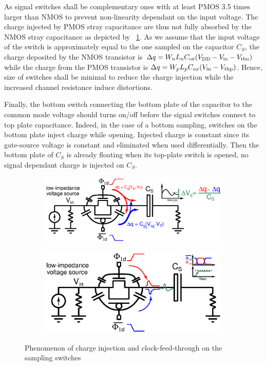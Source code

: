 As signal switches shall be complementary ones with at least PMOS 3.5 times larger than NMOS to prevent non-linearity dependant on the input voltage. The charge injected by PMOS stray capacitance are thus not fully absorbed by the NMOS stray capacitance as depicted by \figurename~\ref{fig:charge-injection-switches}. As we assume that the input voltage of the switch is approximately equal to the one sampled on the capacitor \(C_S\), the charge deposited by the NMOS transistor is \(\Delta q = W_nL_nC_{\rm ox}(V_{\rm DD}-V_{\rm in}-V_{\rm thn}) \) while the charge from the PMOS transistor is \(\Delta q = W_pL_pC_{ox}(V_{\rm in}-V_{\rm thp}) \). Hence, size of switches shall be minimal to reduce the charge injection while the increased channel resistance induce distortions.

Finally, the bottom switch connecting the bottom plate of the capacitor to the common mode voltage should turns on/off before the signal switches connect to top plate capacitance. Indeed, in the case of a bottom sampling, switches on the bottom plate inject charge while opening. Injected charge is constant since its gate-source voltage is constant and eliminated when used differentially. Then the bottom plate of \(C_S\) is already floating when its top-plate switch is opened, no signal dependant charge is injected on \(C_S\).

\begin{figure}[htp]
	\centering
	\begin{subfigure}[b]{0.52\textwidth}
		\centering
		\includegraphics[width=\textwidth]{Chapter4/Figs/charge-injection.ps}
		\label{fig:charge-injection-switches}
	\end{subfigure}
	\begin{subfigure}[b]{0.46\textwidth}
		\centering
		\includegraphics[width=\textwidth]{Chapter4/Figs/clock-feedthrough.ps}
		\label{fig:clock-feedthrough-switches}
	\end{subfigure}
	\caption{Phenomenon of charge injection and clock-feed-through on the sampling switches}
	\label{fig:sample-switches-error-source}
\end{figure}

